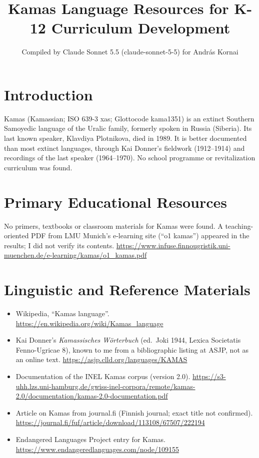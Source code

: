 \documentclass[12pt]{article}
\title{Kamas Language Resources for K-12 Curriculum Development}
\author{Compiled by Claude Sonnet 5.5 (claude-sonnet-5-5) for Andr\'as Kornai}
\date{}
\begin{document}
\maketitle

\section{Introduction}
Kamas (Kamassian; ISO 639-3 xas; Glottocode kama1351) is an extinct Southern Samoyedic language of the Uralic family, formerly spoken in Russia (Siberia). Its last known speaker, Klavdiya Plotnikova, died in 1989. It is better documented than most extinct languages, through Kai Donner's fieldwork (1912--1914) and recordings of the last speaker (1964--1970). No school programme or revitalization curriculum was found.

\section{Primary Educational Resources}
No primers, textbooks or classroom materials for Kamas were found. A teaching-oriented PDF from LMU Munich's e-learning site (``o1 kamas'') appeared in the results; I did not verify its contents. \url{https://www.infuse.finnougristik.uni-muenchen.de/e-learning/kamas/o1_kamas.pdf}

\section{Linguistic and Reference Materials}
\begin{itemize}
\item Wikipedia, ``Kamas language''. \url{https://en.wikipedia.org/wiki/Kamas_language}
\item Kai Donner's \emph{Kamassisches W\"orterbuch} (ed.\ Joki 1944, Lexica Societatis Fenno-Ugricae 8), known to me from a bibliographic listing at ASJP, not as an online text. \url{https://asjp.clld.org/languages/KAMAS}
\item Documentation of the INEL Kamas corpus (version 2.0). \url{https://s3-uhh.lzs.uni-hamburg.de/gwiss-inel-corpora/remote/kamas-2.0/documentation/kamas-2.0-documentation.pdf}
\item Article on Kamas from journal.fi (Finnish journal; exact title not confirmed). \url{https://journal.fi/fuf/article/download/113108/67507/222194}
\item Endangered Languages Project entry for Kamas. \url{https://www.endangeredlanguages.com/node/109155}
\end{itemize}
\end{document}
